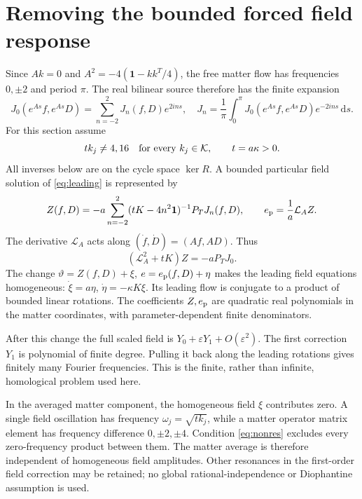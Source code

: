 \documentclass[11pt,a4paper]{article}
\newcommand{\id}{\mathbf1}\newcommand{\dd}{\mathrm d}\newcommand{\diag}{\operatorname{diag}}
\begin{document}
\newpage
\section{Removing the bounded forced field response}
Since $Ak=0$ and $A^2=-4(\id-kk^T/4)$, the free matter flow has frequencies $0,\pm2$ and period $\pi$. The real bilinear source therefore has the finite expansion
\[
J_0(e^{As}f,e^{As}D)=\sum_{n=-2}^{2}J_n(f,D)e^{2ins},
\quad
J_n=\frac1\pi\int_0^\pi J_0(e^{As}f,e^{As}D)e^{-2ins}\,\dd s.
\]
For this section assume
\begin{equation}
tk_j\ne4,16\quad\hbox{for every }k_j\in\mathcal K,
\qquad t=a\kappa>0.\label{eq:nonres}
\end{equation}
All inverses below are on the cycle space $\ker R$. A bounded particular field solution of \eqref{eq:leading} is represented by
\begin{equation}
Z(f,D)=-a\sum_{n=-2}^{2}(tK-4n^2\id)^{-1}P_TJ_n(f,D),\qquad
e_{\rm p}=\frac1a\mathcal L_AZ.\label{eq:particular}
\end{equation}
The derivative $\mathcal L_A$ acts along $(\dot f,\dot D)=(Af,AD)$. Thus
\[
(\mathcal L_A^2+tK)Z=-aP_TJ_0.
\]
The change $\vartheta=Z(f,D)+\xi$, $e=e_{\rm p}(f,D)+\eta$ makes the leading field equations homogeneous: $\dot\xi=a\eta$, $\dot\eta=-\kappa K\xi$. Its leading flow is conjugate to a product of bounded linear rotations. The coefficients $Z,e_{\rm p}$ are quadratic real polynomials in the matter coordinates, with parameter-dependent finite denominators.

After this change the full scaled field is $Y_0+\varepsilon Y_1+O(\varepsilon^2)$. The first correction $Y_1$ is polynomial of finite degree. Pulling it back along the leading rotations gives finitely many Fourier frequencies. This is the finite, rather than infinite, homological problem used here.

In the averaged matter component, the homogeneous field $\xi$ contributes zero. A single field oscillation has frequency $\omega_j=\sqrt{tk_j}$, while a matter operator matrix element has frequency difference $0,\pm2,\pm4$. Condition \eqref{eq:nonres} excludes every zero-frequency product between them. The matter average is therefore independent of homogeneous field amplitudes. Other resonances in the first-order field correction may be retained; no global rational-independence or Diophantine assumption is used.

\newpage
\end{document}

